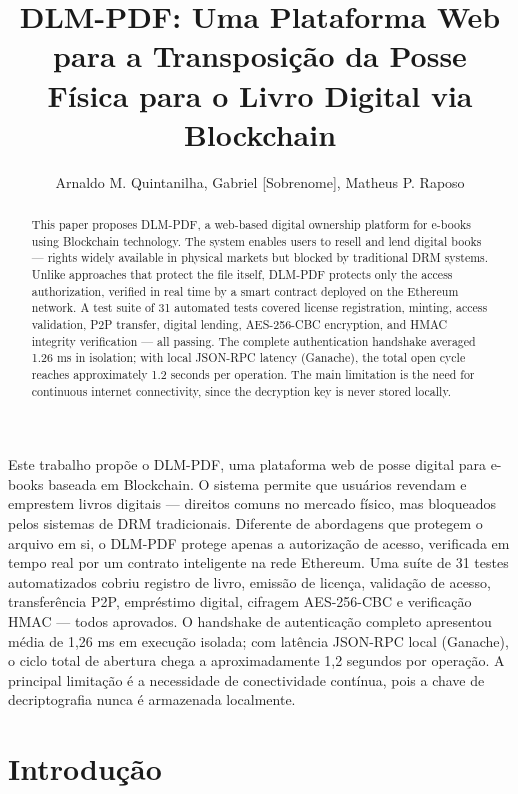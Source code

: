 \documentclass[12pt]{article}
\title{DLM-PDF: Uma Plataforma Web para a Transposição da Posse Física para o Livro Digital via Blockchain}
\author{Arnaldo M. Quintanilha\inst{1}, Gabriel [Sobrenome]\inst{1}, Matheus P. Raposo\inst{2}}
\begin{document}
\maketitle

\begin{abstract}
This paper proposes DLM-PDF, a web-based digital ownership platform for e-books using Blockchain technology. The system enables users to resell and lend digital books — rights widely available in physical markets but blocked by traditional DRM systems. Unlike approaches that protect the file itself, DLM-PDF protects only the access authorization, verified in real time by a smart contract deployed on the Ethereum network. A test suite of 31 automated tests covered license registration, minting, access validation, P2P transfer, digital lending, AES-256-CBC encryption, and HMAC integrity verification — all passing. The complete authentication handshake averaged 1.26 ms in isolation; with local JSON-RPC latency (Ganache), the total open cycle reaches approximately 1.2 seconds per operation. The main limitation is the need for continuous internet connectivity, since the decryption key is never stored locally.
\end{abstract}

\begin{resumo}
Este trabalho propõe o DLM-PDF, uma plataforma web de posse digital para e-books baseada em Blockchain. O sistema permite que usuários revendam e emprestem livros digitais — direitos comuns no mercado físico, mas bloqueados pelos sistemas de DRM tradicionais. Diferente de abordagens que protegem o arquivo em si, o DLM-PDF protege apenas a autorização de acesso, verificada em tempo real por um contrato inteligente na rede Ethereum. Uma suíte de 31 testes automatizados cobriu registro de livro, emissão de licença, validação de acesso, transferência P2P, empréstimo digital, cifragem AES-256-CBC e verificação HMAC — todos aprovados. O handshake de autenticação completo apresentou média de 1,26 ms em execução isolada; com latência JSON-RPC local (Ganache), o ciclo total de abertura chega a aproximadamente 1,2 segundos por operação. A principal limitação é a necessidade de conectividade contínua, pois a chave de decriptografia nunca é armazenada localmente.
\end{resumo}

\section{Introdução}
\end{document}
